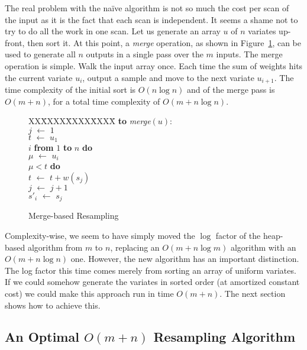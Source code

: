 \documentclass{article}
\newcommand{\asgn}{\,\,\leftarrow\,\,}
\begin{document}
  The real problem with the na\"ive
  algorithm is not so much the cost per scan of the input as it is the
  fact that each scan is independent.  It seems a shame not
  to try to do all the work in one scan.
  Let us generate an array $u$ of $n$ variates up-front,
  then sort it.  At this point, a {\em merge} operation, as
  shown in Figure~\ref{fig:merge}, can be used to generate
  all $n$ outputs in a single pass over the $m$ inputs.  The
  merge operation is simple.  Walk the input array once.
  Each time the sum of weights hits the current variate
  $u_i$, output a sample and move to the next variate
  $u_{i+1}$.  The time complexity of the initial sort is
  $O(n \log n)$ and of the merge pass is $O(m + n)$, for a
  total time complexity of $O(m + n \log n)$.

  \begin{figure}
    \centering
    \begin{minipage}[b]{\linewidth}
      \begin{tabbing}
      XX\=XXXX\=XXXX\=XXXX\=\kill
      {\bf to} {\it merge}$(u)$: \\
      \>$j \asgn 1$ \\
      \>$t \asgn u_1$ \\
       $i$ {\bf from} $1$ {\bf to} $n$ {\bf do} \\
      \>\>$\mu \asgn u_i$ \\
      \> $\mu < t$ {\bf do} \\
      \>\>\>$t \asgn t + w(s_j)$ \\
      \>\>\>$j \asgn j + 1$ \\
      \>\>$s'_i \asgn s_j$
    \end{tabbing}
    \end{minipage}
    \caption{Merge-based Resampling}\label{fig:merge}
  \end{figure}

  Complexity-wise, we seem to have simply moved the $\log$
  factor of the heap-based algorithm from $m$ to $n$,
  replacing an $O(m + n \log m)$ algorithm with an $O(m + n
  \log n)$ one.  However, the new algorithm has an important
  distinction.  The log factor this time comes merely from
  sorting an array of uniform variates.  If we could somehow
  generate the variates in sorted order (at amortized
  constant cost) we could make this approach run in time
  $O(m + n)$.  The next section shows how to achieve this.

\subsection{An Optimal $O(m + n)$ Resampling Algorithm}\label{sec-optimal}
\end{document}
